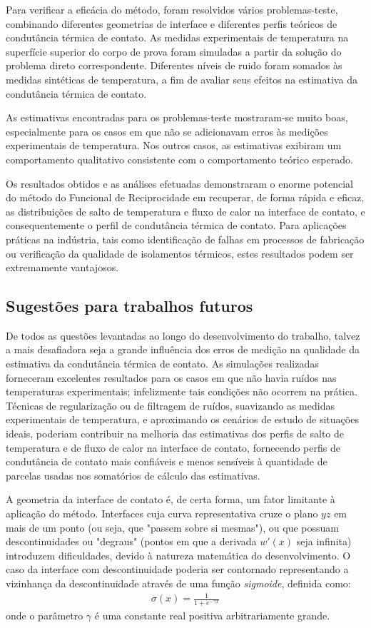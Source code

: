 Para verificar a eficácia do método, foram resolvidos vários problemas-teste, combinando diferentes geometrias de interface e diferentes perfis teóricos de condutância térmica de contato. As medidas experimentais de temperatura na superfície superior do corpo de prova foram simuladas a partir da solução do problema direto correspondente. Diferentes níveis de ruido foram somados às medidas sintéticas de temperatura, a fim de avaliar seus efeitos na estimativa da condutância térmica de contato.

As estimativas encontradas para os problemas-teste mostraram-se muito boas, especialmente para os casos em que não se adicionavam erros às medições experimentais de temperatura. Nos outros casos, as estimativas exibiram um comportamento qualitativo consistente com o comportamento teórico esperado.

Os resultados obtidos e as análises efetuadas demonstraram o enorme potencial do método do Funcional de Reciprocidade em recuperar, de forma rápida e eficaz, as distribuições de salto de temperatura e fluxo de calor na interface de contato, e consequentemente o perfil de condutância térmica de contato. Para aplicações práticas na indústria, tais como identificação de falhas em processos de fabricação ou verificação da qualidade de isolamentos térmicos, estes resultados podem ser extremamente vantajosos.


\subsection{Sugestões para trabalhos futuros}

De todos as questões levantadas ao longo do desenvolvimento do trabalho, talvez a mais desafiadora seja a grande influência dos erros de medição na qualidade da estimativa da condutância térmica de contato. As simulações realizadas forneceram excelentes resultados para os casos em que não havia ruídos nas temperaturas experimentais; infelizmente tais condições não ocorrem na prática. Técnicas de regularização ou de filtragem de ruídos, suavizando as medidas experimentais de temperatura, e aproximando os cenários de estudo de situações ideais, poderiam contribuir na melhoria das estimativas dos perfis de salto de temperatura e de fluxo de calor na interface de contato, fornecendo perfis de condutância de contato mais confiáveis e menos sensíveis à quantidade de parcelas usadas nos somatórios de cálculo das estimativas.

A geometria da interface de contato é, de certa forma, um fator limitante à aplicação do método. Interfaces cuja curva representativa cruze o plano $yz$ em mais de um ponto (ou seja, que "passem sobre si mesmas"), ou que possuam descontinuidades ou "degraus" (pontos em que a derivada $w'(x)$ seja infinita) introduzem dificuldades, devido à natureza matemática do desenvolvimento. O caso da interface com descontinuidade poderia ser contornado representando a vizinhança da descontinuidade através de uma função \textit{sigmoide}, definida como:
\begin{align}
\sigma(x) = \frac{1}{1 + e^{-\gamma x}}
\end{align}
onde o parâmetro $\gamma$ é uma constante real positiva arbitrariamente grande.

